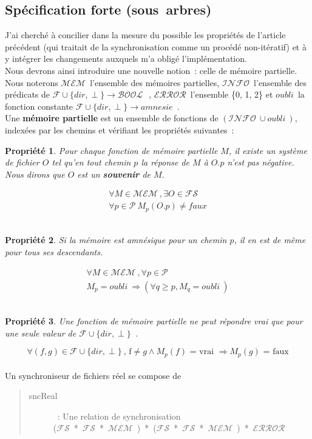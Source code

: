 \documentclass[11pt]{report}
\newtheorem{propri}{Propri\'et\'e}
\newcommand{\fs}{\ensuremath{\mathcal{FS}}}
\newcommand{\bool}{\ensuremath{\mathcal{BOOL}}}
\newcommand{\error}{\ensuremath{\mathcal{ERROR}}}
\newcommand{\mem}{\ensuremath{\mathcal{MEM}}}
\newcommand{\path}{\ensuremath{\mathcal{P}}}
\newcommand{\amne}{\ensuremath{\mathcal{F} 
\cup \{ dir, \perp \} \rightarrow amnesie}}
\newcommand{\ensem}{\ensuremath{\mathcal{F} \cup 
\{ dir, \perp \} \rightarrow \bool\ }}
\newcommand{\dep}{\ensuremath{\mathcal{F} \cup 
\{ dir, \perp \}}}
\newcommand{\amnes}{\ensuremath{\mathit{oubli}}}
\newcommand{\ensemb}{\ensuremath{\mathcal{INFO}}}
\newcommand{\prop}[3]{
\begin{propri}
#1
\end{propri}
\begin{equation} \label{#2}
#3
\end{equation}\\}
\begin{document}
{\subsection{Sp\'ecification forte (sous~arbres)}
J'ai cherch\'e \`a concilier dans la mesure du possible les propri\'et\'es 
de l'article pr\'ec\'edent (qui traitait de la synchronisation comme un 
proc\'ed\'e non-it\'eratif) et \`a y int\'egrer les changements auxquels 
m'a oblig\'e l'impl\'ementation.\\
Nous devrons ainsi introduire une nouvelle notion~: celle de
m\'emoire partielle. \\
Nous noterons \mem\ l'ensemble des m\'emoires partielles, \ensemb\ l'ensemble
des pr\'edicats de \ensem\ , \error\  l'ensemble \{0, 1, 2\} et \amnes\ la 
fonction constante \amne\ .\\
Une \textbf{m\'emoire partielle} est un ensemble de fonctions de 
$(\ensemb\ \cup \amnes\ )$, index\'ees par les chemins et v\'erifiant les 
propri\'et\'es suivantes~:
\prop{Pour chaque fonction de m\'emoire partielle $M$, il existe un 
syst\`eme de fichier $O$ tel qu'en tout chemin $p$ la r\'eponse de $M$ \`a 
$O.p$ n'est pas n\'egative. Nous dirons que $O$ est un \textbf{souvenir} de $M$.}
{propsouv}
{
\begin{array}{l}
\forall M \in \mem\ , \exists O \in \fs\ \\
\forall p \in \path\ M_{p}(O.p) \neq \mathit{faux}
\end{array}
}
\prop{Si la m\'emoire est amn\'esique pour un chemin $p$, il en est de m\^eme
pour tous ses descendants.}
{propdesc}
{
\begin{array}{l}
\forall M \in \mem\ , \forall p \in \path\,\\
 M_{p} = \amnes\ \Rightarrow (\forall q \geq p, M_{q} = \amnes\ )
\end{array}
}
\prop{Une fonction de m\'emoire partielle ne peut r\'epondre vrai que pour une seule valeur de \dep\ .}
{propfiable}
{\forall (f, g) \in \dep\ \mbox{, f} \neq g \wedge M_{p}(f) \mbox{\ = vrai \ } 
\Rightarrow M_{p}(g) \mbox{\ = faux}}
Un synchroniseur de fichiers r\'eel se compose de
\begin{quote}
 \begin{description}
  \item [sncReal]~: Une relation de synchronisation\\
 \mbox{(\fs\ * \fs\ * \mem\ ) * (\fs\ * \fs\ * \mem\ ) * \error\ }
 \end{description}
\end{quote}
}
\end{document}
